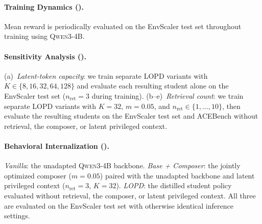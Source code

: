 \documentclass{article} %
\newcommand{\llmname}[1]{\textsc{#1}}
\newcommand{\ourmethod}{{\textsc{LOPD}}\xspace}
\begin{document}
\paragraph{Training Dynamics ().}
Mean reward is periodically evaluated on the EnvScaler test set throughout training using \llmname{Qwen3-4B}.

\paragraph{Sensitivity Analysis ().}
(a)~\textit{Latent-token capacity}: we train separate \ourmethod variants with $K \in \{8, 16, 32, 64, 128\}$ and evaluate each resulting student alone on the EnvScaler test set ($n_\mathrm{ret}{=}3$ during training). (b--e)~\textit{Retrieval count}: we train separate \ourmethod variants with $K{=}32$, $m{=}0.05$, and $n_\mathrm{ret}\in\{1,\ldots,10\}$, then evaluate the resulting students on the EnvScaler test set and ACEBench without retrieval, the composer, or latent privileged context.

\paragraph{Behavioral Internalization ().}
\textit{Vanilla}: the unadapted \llmname{Qwen3-4B} backbone. \textit{Base + Composer}: the jointly optimized composer ($m{=}0.05$) paired with the unadapted backbone and latent privileged context ($n_\mathrm{ret}{=}3$, $K{=}32$). \textit{\ourmethod}: the distilled student policy evaluated without retrieval, the composer, or latent privileged context. All three are evaluated on the EnvScaler test set with otherwise identical inference settings.
\end{document}
